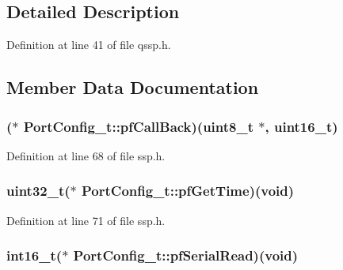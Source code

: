 \subsection{Detailed Description}


Definition at line 41 of file qssp.\-h.



\subsection{Member Data Documentation}
\hypertarget{struct_port_config__t_a761912e7c4f6babdbf30bc5427212175}{
\subsubsection[{pf\-Call\-Back}]{($\ast$ Port\-Config\-\_\-t\-::pf\-Call\-Back)(uint8\-\_\-t $\ast$, uint16\-\_\-t)}}\label{struct_port_config__t_a761912e7c4f6babdbf30bc5427212175}


Definition at line 68 of file ssp.\-h.

\hypertarget{struct_port_config__t_aacab2789effcced0f99bff1dbceb2bbe}{
\subsubsection[{pf\-Get\-Time}]{\setlength{\rightskip}{0pt plus 5cm}uint32\-\_\-t($\ast$ Port\-Config\-\_\-t\-::pf\-Get\-Time)({\bf void})}}\label{struct_port_config__t_aacab2789effcced0f99bff1dbceb2bbe}


Definition at line 71 of file ssp.\-h.

\hypertarget{struct_port_config__t_a99013e72ff1a44c3d4ffc9d4f645862d}{
\subsubsection[{pf\-Serial\-Read}]{\setlength{\rightskip}{0pt plus 5cm}int16\-\_\-t($\ast$ Port\-Config\-\_\-t\-::pf\-Serial\-Read)({\bf void})}}\label{struct_port_config__t_a99013e72ff1a44c3d4ffc9d4f645862d}


